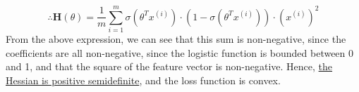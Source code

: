 \begin{equation*}
    \therefore
    \boxed{
        \mathbf{H}(\theta)
        =
        \frac{1}{m} \sum_{i=1}^{m}
        \sigma\left(\theta^{T} x^{(i)}\right) \cdot \left(1-\sigma\left(\theta^{T} x^{(i)}\right)\right)
        \cdot {\left(x^{(i)}\right)}^2
    }
\end{equation*}
From the above expression, we can see that this sum is non-negative, since the coefficients are all non-negative, since the logistic function is bounded between 0 and 1, and that the square of the feature vector is non-negative.
Hence, \underline{the Hessian is positive semidefinite}, and the loss function is convex.

